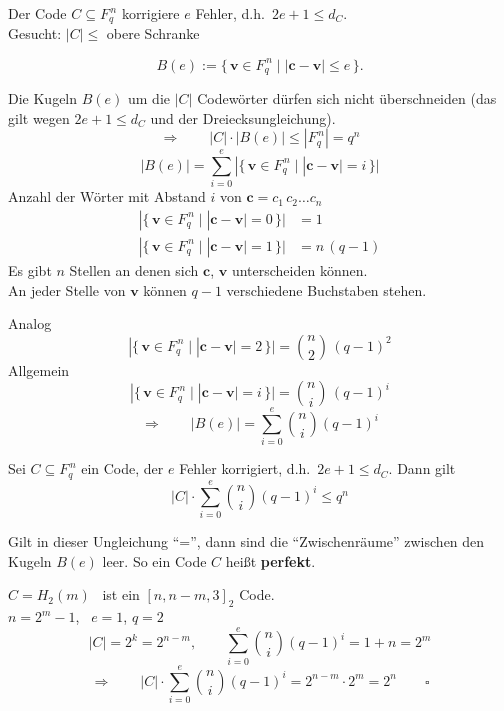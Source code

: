 Der Code $C \subseteq F_q^{\,n}$ korrigiere $e$ Fehler, d.h.\ $2e + 1 \leq d_C$.\\
Gesucht: \qquad $|C| \leq$ obere Schranke

\begin{definition}
\[ B(e) := \{\, \mathbf{v} \in F_q^{\,n} \mid |\mathbf{c} - \mathbf{v}| \leq e \,\}. \]
\end{definition}

Die Kugeln $B(e)$ um die $|C|$ Codewörter dürfen sich nicht überschneiden (das gilt wegen $2e + 1 \leq d_C$ und der Dreiecksungleichung).
\[ \Rightarrow \qquad |C| \cdot |B(e)| \leq |F_q^{\,n}| = q^n \]
\[ |B(e)| = \sum_{i=0}^{e} |\{\, \mathbf{v} \in F_q^{\,n} \mid |\mathbf{c} - \mathbf{v}| = i \,\}| \]
Anzahl der Wörter mit Abstand $i$ von $\mathbf{c} = c_1\,c_2 \dots c_n$
\begin{align*}
|\{\, \mathbf{v} \in F_q^{\,n} \mid |\mathbf{c} - \mathbf{v}| = 0 \,\}| &= 1 \\
|\{\, \mathbf{v} \in F_q^{\,n} \mid |\mathbf{c} - \mathbf{v}| = 1 \,\}| &= n\,(q - 1)
\end{align*}
Es gibt $n$ Stellen an denen sich $\mathbf{c}$, $\mathbf{v}$ unterscheiden können.\\
An jeder Stelle von $\mathbf{v}$ können $q - 1$ verschiedene Buchstaben stehen.

Analog
\[ |\{\, \mathbf{v} \in F_q^{\,n} \mid |\mathbf{c} - \mathbf{v}| = 2 \,\}| = \binom{n}{2}\,(q - 1)^2 \]
Allgemein
\[ |\{\, \mathbf{v} \in F_q^{\,n} \mid |\mathbf{c} - \mathbf{v}| = i \,\}| = \binom{n}{i}\,(q - 1)^i \]
\[ \Rightarrow \qquad |B(e)| = \sum_{i=0}^{e} \binom{n}{i} (q-1)^i \]

\begin{satz}[Hamming-Schranke]
Sei $C \subseteq F_q^{\,n}$ ein Code, der $e$ Fehler korrigiert, d.h.\ $2e + 1 \leq d_C$. Dann gilt
\[ |C| \cdot \sum_{i=0}^{e} \binom{n}{i} (q-1)^i \leq q^n \]
\end{satz}

\begin{definition}[perfekt]
Gilt in dieser Ungleichung "`="', dann sind die "`Zwischenräume"' zwischen den Kugeln $B(e)$ leer. So ein Code $C$ heißt \textbf{perfekt}.
\end{definition}

\begin{beispiel}
$C = H_2(m)$ \ ist ein $[n, n - m, 3]_2$ Code.\\
$n = 2^m - 1$, \ $e = 1$, $q = 2$
\[ |C| = 2^k = 2^{n-m}, \qquad \sum_{i=0}^{e} \binom{n}{i} (q-1)^i = 1 + n = 2^m \]
\[ \Rightarrow \qquad |C| \cdot \sum_{i=0}^{e} \binom{n}{i} (q-1)^i = 2^{n-m} \cdot 2^m = 2^n \qquad \square \]
\end{beispiel}

